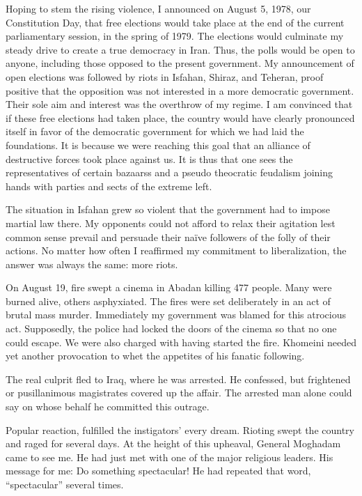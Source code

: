 Hoping to stem the rising violence, I announced on August 5, 1978, our Constitution Day, that free elections would take place at the end of the current parliamentary session, in the spring of 1979. The elections would culminate my steady drive to create a true democracy in Iran. Thus, the polls would be open to anyone, including those opposed to the present government. My announcement of open elections was followed by riots in Isfahan, Shiraz, and Teheran, proof positive that the opposition was not interested in a more democratic government. Their sole aim and interest was the overthrow of my regime. I am convinced that if these free elections had taken place, the country would have clearly pronounced itself in favor of the democratic government for which we had laid the foundations. It is because we were reaching this goal that an alliance of destructive forces took place against us. It is thus that one sees the representatives of certain bazaarss and a pseudo theocratic feudalism joining hands with parties and sects of the extreme left. 

The situation in Isfahan grew so violent that the government had to impose martial law there. My opponents could not afford to relax their agitation lest common sense prevail and persuade their naïve followers of the folly of their actions. No matter how often I reaffirmed my commitment to liberalization, the answer was always the same: more riots. 

On August 19, fire swept a cinema in Abadan killing 477 people. Many were burned alive, others asphyxiated. The fires were set deliberately in an act of brutal mass murder. Immediately my government was blamed for this atrocious act. Supposedly, the police had locked the doors of the cinema so that no one could escape. We were also charged with having started the fire. Khomeini needed yet another provocation to whet the appetites of his fanatic following. 

The real culprit fled to Iraq, where he was arrested. He confessed, but frightened or pusillanimous magistrates covered up the affair. The arrested man alone could say on whose behalf he committed this outrage. 

Popular reaction, fulfilled the instigators’ every dream. Rioting swept the country and raged for several days. At the height of this upheaval, General Moghadam came to see me. He had just met with one of the major religious leaders. His message for me: Do something spectacular! He had repeated that word, “spectacular” several times. 

